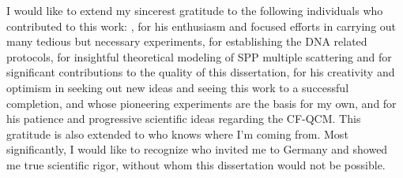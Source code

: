 I would like to extend my sincerest gratitude to the following individuals who
contributed to this work: , for his enthusiasm and focused
efforts in carrying out many tedious but necessary experiments,
 for establishing the DNA related protocols,
 for insightful theoretical modeling of SPP multiple
scattering and for significant contributions to the quality of this
dissertation,  for his creativity and optimism in seeking
out new ideas and seeing this work to a successful completion,
 and  whose pioneering
experiments are the basis for my own, and  for his patience and
progressive scientific ideas regarding the CF-QCM\@. This gratitude is also
extended to  who knows where I'm coming from.  Most
significantly, I would like to recognize  who invited me
to Germany and showed me true scientific rigor, without whom this dissertation
would not be possible.
